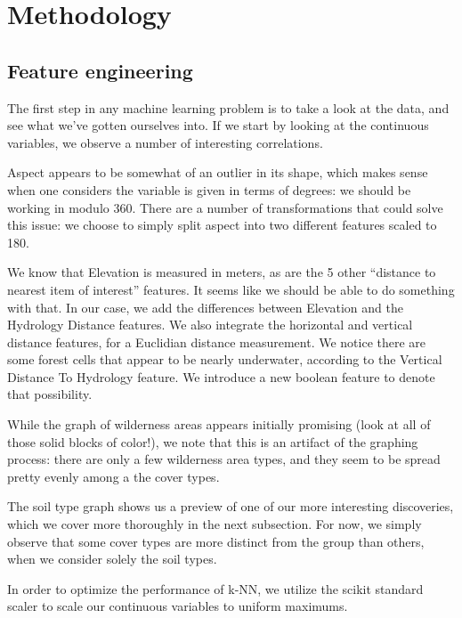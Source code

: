 \section{Methodology}
\label{sec:-method}


\subsection{Feature engineering}
The first step in any machine learning problem is to take a look at the 
data, and see what we've gotten ourselves into.  If we start by looking 
at the continuous variables, we observe a number of interesting 
correlations.  

Aspect appears to be somewhat of an outlier in its shape, 
which makes sense when one considers the variable is given in terms of 
degrees: we should be working in modulo 360.  There are a number of 
transformations that could solve this issue: we choose to simply split 
aspect into two different features scaled to 180\degree.

We know that Elevation is measured in meters, as are the 5 other 
``distance to nearest item of interest'' features.  It seems like we 
should be able to do something with that.  In our case, we add the 
differences between Elevation and the Hydrology Distance features.  We 
also integrate the horizontal and vertical distance features, for a 
Euclidian distance measurement. We notice there are some forest cells 
that appear to be nearly underwater, according to the Vertical Distance 
To Hydrology feature.  We introduce a new boolean feature to denote 
that possibility.  

While the graph of wilderness areas appears initially promising (look 
at all of those solid blocks of color!), we note that this is an 
artifact of the graphing process: there are only a few wilderness area 
types, and they seem to be spread pretty evenly among a the cover types.

The soil type graph shows us a preview of one of our more interesting 
discoveries, which we cover more thoroughly in the next subsection. For 
now, we simply observe that some cover types are more distinct from the 
group than others, when we consider solely the soil types.

In order to optimize the performance of k-NN, we utilize the scikit 
standard scaler to scale our continuous variables to uniform maximums.

